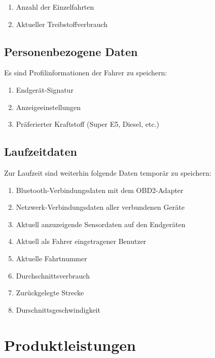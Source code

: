 \documentclass[pflichtenheft.tex]{subfiles}
\begin{document}
\begin{enumerate}
\setcounter{enumi}{\value{enumTemp}}
\item Anzahl der Einzelfahrten
\item Aktueller Treibstoffverbrauch
\setcounter{enumTemp}{\value{enumi}}
\end{enumerate}

\section{Personenbezogene Daten}
Es sind Profilinformationen der Fahrer zu speichern:

\begin{enumerate}
\setcounter{enumi}{\value{enumTemp}}
\item Endgerät-Signatur
\item Anzeigeeinstellungen
\item Präferierter Kraftstoff (Super E5, Diesel, etc.)
\setcounter{enumTemp}{\value{enumi}}
\end{enumerate}

\section{Laufzeitdaten}
Zur Laufzeit sind weiterhin folgende Daten temporär zu speichern:
\begin{enumerate}
\setcounter{enumi}{\value{enumTemp}}
\item Bluetooth-Verbindungsdaten mit dem OBD2-Adapter
\item Netzwerk-Verbindungsdaten aller verbundenen Geräte
\item Aktuell anzuzeigende Sensordaten auf den Endgeräten
\item Aktuell als Fahrer eingetragener Benutzer
\item Aktuelle Fahrtnummer
\item Durchschnittsverbrauch
\item Zurückgelegte Strecke
\item Durschnittsgeschwindigkeit
\setcounter{enumTemp}{\value{enumi}}
\end{enumerate}

\chapter{Produktleistungen}

\renewcommand{\theenumi}{/PL\ifnum \value{enumi}<10 0\fi\arabic{enumi}0/}
\renewcommand{\labelenumi}{\theenumi}
\renewcommand{\theenumii}{\arabic{enumii}}
\renewcommand{\labelenumii}{PL\ifnum \value{enumi}<10 0\fi\arabic{enumi}\arabic{enumii}/}
\end{document}
